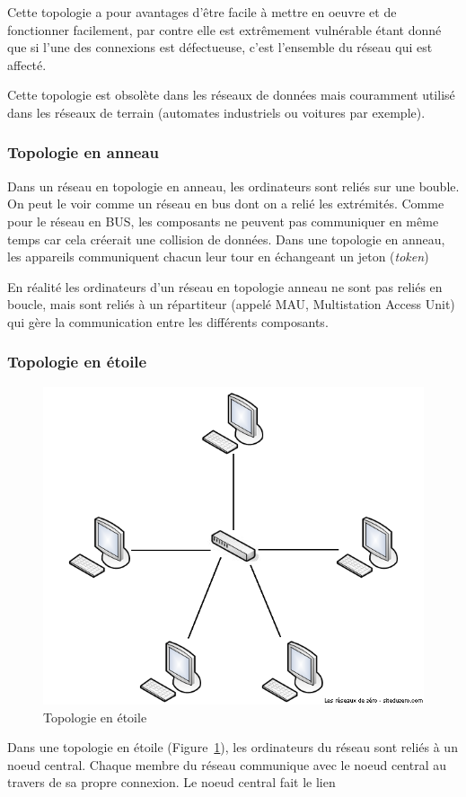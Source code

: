 Cette topologie a pour avantages d'être {facile à mettre en oeuvre} et de fonctionner facilement, par contre elle est extrêmement {vulnérable} étant donné que si l'une des connexions est défectueuse, c'est l'ensemble du réseau qui est affecté.

Cette topologie est obsolète dans les réseaux de données mais couramment utilisé dans les réseaux de terrain (automates industriels ou voitures par exemple).

\subsubsection{Topologie en anneau}

Dans un réseau en topologie en anneau, les ordinateurs sont reliés sur une bouble. On peut le voir comme un réseau en bus dont on a relié les extrémités. Comme pour le réseau en BUS, les composants ne peuvent pas communiquer en même temps car cela créerait une collision de données. Dans une topologie en anneau, les appareils communiquent chacun leur tour en échangeant un jeton (\textit{token})

En réalité les ordinateurs d'un réseau en topologie anneau ne sont pas reliés en boucle, mais sont reliés à un répartiteur (appelé MAU, Multistation Access Unit) qui gère la communication entre les différents composants.

\subsubsection{Topologie en étoile}
\begin{figure}[h!]
  \centering
  \includegraphics[width=.4\textwidth]{images/topologies/topologieEtoile}
  \caption{Topologie en étoile}
  \label{fig:topoEtoile}
\end{figure}
Dans une topologie en étoile (Figure~\ref{fig:topoEtoile}), les ordinateurs du réseau sont reliés à un noeud central. Chaque membre du réseau communique avec le noeud central au travers de sa propre connexion. Le noeud central fait le lien

